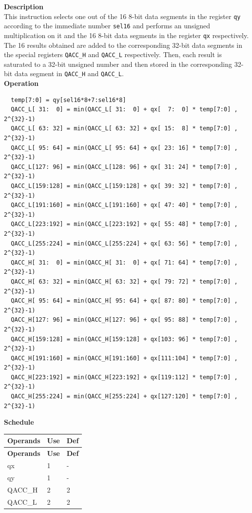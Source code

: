 \textbf{Description}\\
This instruction selects one out of the 16 8-bit data segments in the register \lstinline{qy} according to the immediate number \lstinline{sel16} and performs an unsigned multiplication on it and the 16 8-bit data segments in the register \lstinline{qx} respectively. The 16 results obtained are added to the corresponding 32-bit data segments in the special registers \lstinline{QACC_H} and \lstinline{QACC_L} respectively. Then, each result is saturated to a 32-bit unsigned number and then stored in the corresponding 32-bit data segment in \lstinline{QACC_H} and \lstinline{QACC_L}.\\
\textbf{Operation}
\begin{lstlisting}
  temp[7:0] = qy[sel16*8+7:sel16*8]
  QACC_L[ 31:  0] = min(QACC_L[ 31:  0] + qx[  7:  0] * temp[7:0] , 2^{32}-1)
  QACC_L[ 63: 32] = min(QACC_L[ 63: 32] + qx[ 15:  8] * temp[7:0] , 2^{32}-1)
  QACC_L[ 95: 64] = min(QACC_L[ 95: 64] + qx[ 23: 16] * temp[7:0] , 2^{32}-1)
  QACC_L[127: 96] = min(QACC_L[128: 96] + qx[ 31: 24] * temp[7:0] , 2^{32}-1)
  QACC_L[159:128] = min(QACC_L[159:128] + qx[ 39: 32] * temp[7:0] , 2^{32}-1)
  QACC_L[191:160] = min(QACC_L[191:160] + qx[ 47: 40] * temp[7:0] , 2^{32}-1)
  QACC_L[223:192] = min(QACC_L[223:192] + qx[ 55: 48] * temp[7:0] , 2^{32}-1)
  QACC_L[255:224] = min(QACC_L[255:224] + qx[ 63: 56] * temp[7:0] , 2^{32}-1)
  QACC_H[ 31:  0] = min(QACC_H[ 31:  0] + qx[ 71: 64] * temp[7:0] , 2^{32}-1)
  QACC_H[ 63: 32] = min(QACC_H[ 63: 32] + qx[ 79: 72] * temp[7:0] , 2^{32}-1)
  QACC_H[ 95: 64] = min(QACC_H[ 95: 64] + qx[ 87: 80] * temp[7:0] , 2^{32}-1)
  QACC_H[127: 96] = min(QACC_H[127: 96] + qx[ 95: 88] * temp[7:0] , 2^{32}-1)
  QACC_H[159:128] = min(QACC_H[159:128] + qx[103: 96] * temp[7:0] , 2^{32}-1)
  QACC_H[191:160] = min(QACC_H[191:160] + qx[111:104] * temp[7:0] , 2^{32}-1)
  QACC_H[223:192] = min(QACC_H[223:192] + qx[119:112] * temp[7:0] , 2^{32}-1)
  QACC_H[255:224] = min(QACC_H[255:224] + qx[127:120] * temp[7:0] , 2^{32}-1)

\end{lstlisting}

\textbf{Schedule}\\
\begin{longtable}[c]{|l|l|l|}
    \hline
    \rowcolor{lightgray}
    \textbf{Operands} & \textbf{Use} & \textbf{Def} \\\hline
    \endfirsthead
    \hline
    \rowcolor{lightgray}
     \textbf{Operands} & \textbf{Use} & \textbf{Def} \\\hline
    \endhead
    \hline
    \endfoot

     qx & 1 & - \\\hline
     qy & 1 & - \\\hline
     QACC\_H & 2 & 2 \\\hline
     QACC\_L & 2 & 2

\end{longtable}

